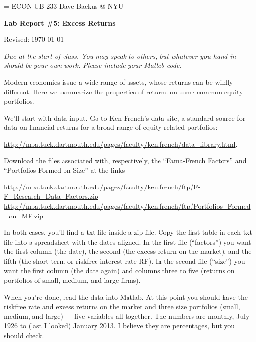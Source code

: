\documentclass[11pt]{exam}
\begin{document}
\parskip=\bigskipamount
\parindent=0.0in
\thispagestyle{empty}
{\large ECON-UB 233 \hfill Dave Backus @ NYU}

\bigskip\bigskip
\centerline{\Large \bf Lab Report \#5: Excess Returns}
\centerline{Revised: \today}

\bigskip
{\it Due at the start of class.
You may speak to others, but whatever you hand in should be your own work.
Please include your Matlab code.}

\begin{questions}
Modern economies issue a wide range of assets,
whose returns can be wildly different.
Here we summarize the properties of
returns on some common equity portfolios.

We'll start with data input.  Go to Ken French's data site,
a standard source for data on financial returns for a broad range
of equity-related portfolios:

{\small
\url{http://mba.tuck.dartmouth.edu/pages/faculty/ken.french/data_library.html}}.

Download the files associated with, respectively, the ``Fama-French Factors''
and ``Portfolios Formed on Size'' at the links

{\small
\url{http://mba.tuck.dartmouth.edu/pages/faculty/ken.french/ftp/F-F_Research_Data_Factors.zip} \\
\url{http://mba.tuck.dartmouth.edu/pages/faculty/ken.french/ftp/Portfolios_Formed_on_ME.zip}.
}

In both cases, you'll find a txt file inside a zip file.
Copy the first table in each txt file into a spreadsheet with the dates aligned.
In the first file (``factors'') you want the first column (the date),
the second (the excess return on the market),
and the fifth (the short-term or riskfree interest rate RF).
In the second file (``size'') you want the first column (the date again)
and columns three to five (returns on portfolios of small, medium, and large firms).

When you're done, read the data into Matlab.
At this point you should have the riskfree rate and excess returns
on the market and three size portfolios (small, medium, and large) ---
five variables all together.
The numbers are monthly, July 1926 to (last I looked) January 2013.
I believe they are percentages, but you should check.
%
\end{questions}
\end{document}
